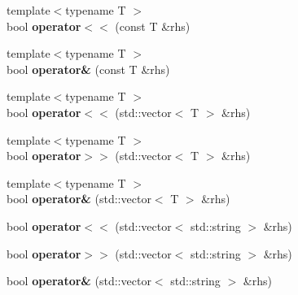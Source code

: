 \begin{DoxyCompactItemize}
\item 
\hypertarget{classBinaryStream_a5d35da3114fb5570df28ea1e3a4e8fce}{{\footnotesize template$<$typename T $>$ }\\bool {\bfseries operator$<$$<$} (const T \&rhs)}\label{classBinaryStream_a5d35da3114fb5570df28ea1e3a4e8fce}

\item 
\hypertarget{classBinaryStream_ae99a183981d74ef9c2750e13ae38eab9}{{\footnotesize template$<$typename T $>$ }\\bool {\bfseries operator\&} (const T \&rhs)}\label{classBinaryStream_ae99a183981d74ef9c2750e13ae38eab9}

\item 
\hypertarget{classBinaryStream_a00d6e0b4b6bf11a8848116f206dec363}{{\footnotesize template$<$typename T $>$ }\\bool {\bfseries operator$<$$<$} (std\-::vector$<$ T $>$ \&rhs)}\label{classBinaryStream_a00d6e0b4b6bf11a8848116f206dec363}

\item 
\hypertarget{classBinaryStream_ae2bf62a35f010ee108e9c730b9022bd6}{{\footnotesize template$<$typename T $>$ }\\bool {\bfseries operator$>$$>$} (std\-::vector$<$ T $>$ \&rhs)}\label{classBinaryStream_ae2bf62a35f010ee108e9c730b9022bd6}

\item 
\hypertarget{classBinaryStream_a18219bb858eb598fba2c7f13124d1c20}{{\footnotesize template$<$typename T $>$ }\\bool {\bfseries operator\&} (std\-::vector$<$ T $>$ \&rhs)}\label{classBinaryStream_a18219bb858eb598fba2c7f13124d1c20}

\item 
\hypertarget{classBinaryStream_a7111a8a1fd05f68472250c955d8c2bb9}{bool {\bfseries operator$<$$<$} (std\-::vector$<$ std\-::string $>$ \&rhs)}\label{classBinaryStream_a7111a8a1fd05f68472250c955d8c2bb9}

\item 
\hypertarget{classBinaryStream_a20914e832cc3ee4de025151c0b781b11}{bool {\bfseries operator$>$$>$} (std\-::vector$<$ std\-::string $>$ \&rhs)}\label{classBinaryStream_a20914e832cc3ee4de025151c0b781b11}

\item 
\hypertarget{classBinaryStream_a9e4c2437ef5cbac2a919fb92ebbcbbce}{bool {\bfseries operator\&} (std\-::vector$<$ std\-::string $>$ \&rhs)}\label{classBinaryStream_a9e4c2437ef5cbac2a919fb92ebbcbbce}


\end{DoxyCompactItemize}

